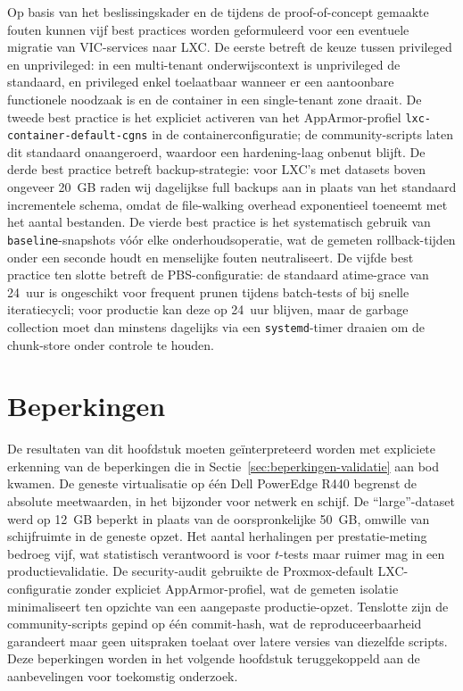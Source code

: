 Op basis van het beslissingskader en de tijdens de proof-of-concept gemaakte fouten kunnen vijf best practices worden geformuleerd voor een eventuele migratie van VIC-services naar LXC. De eerste betreft de keuze tussen privileged en unprivileged: in een multi-tenant onderwijscontext is unprivileged de standaard, en privileged enkel toelaatbaar wanneer er een aantoonbare functionele noodzaak is en de container in een single-tenant zone draait. De tweede best practice is het expliciet activeren van het AppArmor-profiel \texttt{lxc-container-default-cgns} in de containerconfiguratie; de community-scripts laten dit standaard onaangeroerd, waardoor een hardening-laag onbenut blijft. De derde best practice betreft backup-strategie: voor LXC's met datasets boven ongeveer 20~GB raden wij dagelijkse full backups aan in plaats van het standaard incrementele schema, omdat de file-walking overhead exponentieel toeneemt met het aantal bestanden. De vierde best practice is het systematisch gebruik van \texttt{baseline}-snapshots vóór elke onderhoudsoperatie, wat de gemeten rollback-tijden onder een seconde houdt en menselijke fouten neutraliseert. De vijfde best practice ten slotte betreft de PBS-configuratie: de standaard atime-grace van 24~uur is ongeschikt voor frequent prunen tijdens batch-tests of bij snelle iteratiecycli; voor productie kan deze op 24~uur blijven, maar de garbage collection moet dan minstens dagelijks via een \texttt{systemd}-timer draaien om de chunk-store onder controle te houden.

\section{Beperkingen}
\label{sec:resultaten-beperkingen}

De resultaten van dit hoofdstuk moeten geïnterpreteerd worden met expliciete erkenning van de beperkingen die in Sectie~\ref{sec:beperkingen-validatie} aan bod kwamen. De geneste virtualisatie op één Dell PowerEdge R440 begrenst de absolute meetwaarden, in het bijzonder voor netwerk en schijf. De ``large''-dataset werd op 12~GB beperkt in plaats van de oorspronkelijke 50~GB, omwille van schijfruimte in de geneste opzet. Het aantal herhalingen per prestatie-meting bedroeg vijf, wat statistisch verantwoord is voor $t$-tests maar ruimer mag in een productievalidatie. De security-audit gebruikte de Proxmox-default LXC-configuratie zonder expliciet AppArmor-profiel, wat de gemeten isolatie minimaliseert ten opzichte van een aangepaste productie-opzet. Tenslotte zijn de community-scripts gepind op één commit-hash, wat de reproduceerbaarheid garandeert maar geen uitspraken toelaat over latere versies van diezelfde scripts. Deze beperkingen worden in het volgende hoofdstuk teruggekoppeld aan de aanbevelingen voor toekomstig onderzoek.
